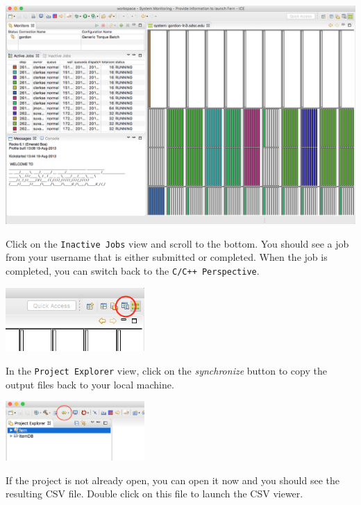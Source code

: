 \begin{center} \includegraphics[width=\textwidth]{figures/sysMon}
\end{center}

Click on the \texttt{Inactive Jobs} view and scroll to the bottom. You should
see a job from your username that is either submitted or completed. When the job
is completed, you can switch back to the \texttt{C/C++ Perspective}.

\begin{center} \includegraphics[width=200]{figures/cppPersp}
\end{center}

In the \texttt{Project Explorer} view, click on the \textit{synchronize}
button to copy the output files back to your local machine. 

\begin{center} \includegraphics[width=200]{figures/syncButton}
\end{center}

If the project is not already open, you can open it now and
you should see the resulting CSV file. Double click on this file to launch the CSV viewer.

